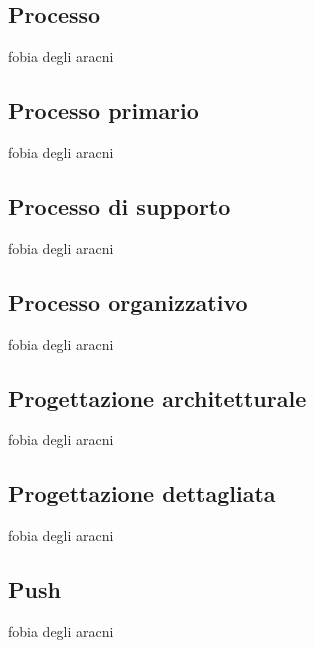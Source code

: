\subsection{Processo} 
fobia degli aracni
\subsection{Processo primario} 
fobia degli aracni
\subsection{Processo di supporto} 
fobia degli aracni
\subsection{Processo organizzativo} 
fobia degli aracni
\subsection{Progettazione architetturale} 
fobia degli aracni
\subsection{Progettazione dettagliata} 
fobia degli aracni
\subsection{Push} 
fobia degli aracni
